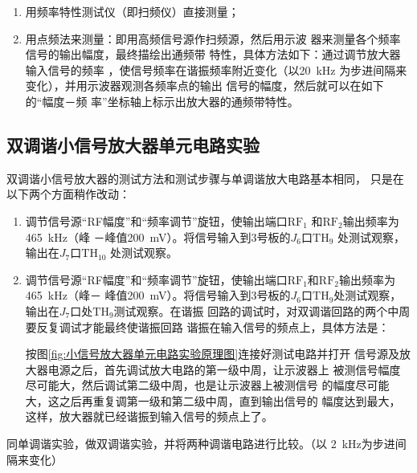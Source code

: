 \documentclass[../main]{subfiles}
\begin{document}
\begin{enumerate}
\begin{enumerate}
			\item 用频率特性测试仪（即扫频仪）直接测量；

			\item 用点频法来测量：即用高频信号源作扫频源，然后用示波
				器来测量各个频率信号的输出幅度，最终描绘出通频带
				特性，具体方法如下：通过调节放大器输入信号的频率
				，使信号频率在谐振频率附近变化（以\SI{20}{\kHz}
				为步进间隔来变化），并用示波器观测各频率点的输出
				信号的幅度，然后就可以在如下的\enquote{幅度－频
				率}坐标轴上标示出放大器的通频带特性。

		\end{enumerate}

\end{enumerate}

\subsection{双调谐小信号放大器单元电路实验}%
\label{sub:双调谐小信号放大器单元电路实验}

双调谐小信号放大器的测试方法和测试步骤与单调谐放大电路基本相同，
只是在以下两个方面稍作改动：

\begin{enumerate}

	\item 调节信号源\enquote{RF幅度}和\enquote{频率调节}旋钮，使输出端口$
		\mathrm{RF}_1 $ 和$ \mathrm{RF}_2 $输出频率为\SI{465}{\kHz}（峰
		－峰值\SI{200}{\mV}）。将信号输入到3号板的$ J_6 $口$
		\mathrm{TH}_9 $ 处测试观察，输出在$ J_7 $口$ \mathrm{TH}_{10} $
		处测试观察。

	\item 调节信号源\enquote{RF幅度}和\enquote{频率调节}旋钮，使输出端口$
		\mathrm{RF}_1 $和$ \mathrm{RF}_2 $输出频率为\SI{465}{\kHz}（峰－
		峰值\SI{200}{\mV}）。将信号输入到3号板的$ J_6 $口$ \mathrm{TH}_9
		$处测试观察，输出在$ J_7 $口处$ \mathrm{TH}_9 $测试观察。在谐振
		回路的调试时，对双调谐回路的两个中周要反复调试才能最终使谐振回路
		谐振在输入信号的频点上，具体方法是：

		按图\ref{fig:小信号放大器单元电路实验原理图}连接好测试电路并打开
		信号源及放大器电源之后，首先调试放大电路的第一级中周，让示波器上
		被测信号幅度尽可能大，然后调试第二级中周，也是让示波器上被测信号
		的幅度尽可能大，这之后再重复调第一级和第二级中周，直到输出信号的
		幅度达到最大，这样，放大器就已经谐振到输入信号的频点上了。

\end{enumerate}

同单调谐实验，做双调谐实验，并将两种调谐电路进行比较。（以 \SI{2}{\kHz}为步进间
隔来变化）
\end{document}
